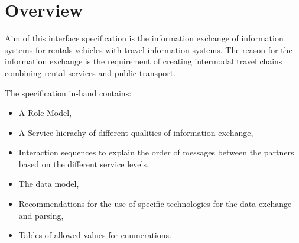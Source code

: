 \chapter{Overview}
\label{cha:Zusammenfassung}

Aim of this interface specification is the information exchange of information systems for rentals vehicles with travel information systems.
The reason for the information exchange is the requirement of creating intermodal travel chains combining rental services and public transport.


The specification in-hand contains:
\begin{itemize}
\item A Role Model,
\item A Service hierachy of different qualities of information exchange,
\item Interaction sequences to explain the order of messages between the partners based on the different service levels,
\item The data model,
\item Recommendations for the use of specific technologies for the data exchange and parsing,
\item Tables of allowed values for enumerations.
\end{itemize}
